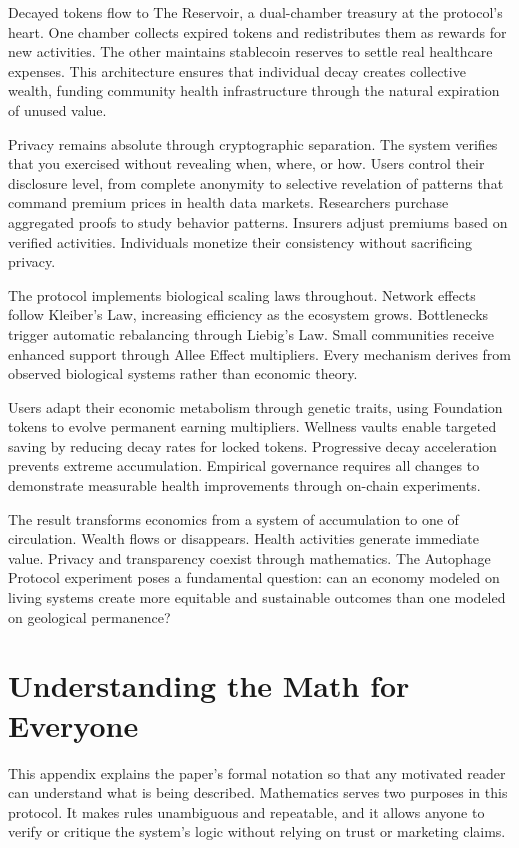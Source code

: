 \documentclass[11pt,letterpaper]{article}
\begin{document}
Decayed tokens flow to The Reservoir, a dual-chamber treasury at the protocol's heart. One chamber collects expired tokens and redistributes them as rewards for new activities. The other maintains stablecoin reserves to settle real healthcare expenses. This architecture ensures that individual decay creates collective wealth, funding community health infrastructure through the natural expiration of unused value.

Privacy remains absolute through cryptographic separation. The system verifies that you exercised without revealing when, where, or how. Users control their disclosure level, from complete anonymity to selective revelation of patterns that command premium prices in health data markets. Researchers purchase aggregated proofs to study behavior patterns. Insurers adjust premiums based on verified activities. Individuals monetize their consistency without sacrificing privacy.

\clearpage

The protocol implements biological scaling laws throughout. Network effects follow Kleiber's Law, increasing efficiency as the ecosystem grows. Bottlenecks trigger automatic rebalancing through Liebig's Law. Small communities receive enhanced support through Allee Effect multipliers. Every mechanism derives from observed biological systems rather than economic theory.

Users adapt their economic metabolism through genetic traits, using Foundation tokens to evolve permanent earning multipliers. Wellness vaults enable targeted saving by reducing decay rates for locked tokens. Progressive decay acceleration prevents extreme accumulation. Empirical governance requires all changes to demonstrate measurable health improvements through on-chain experiments.

The result transforms economics from a system of accumulation to one of circulation. Wealth flows or disappears. Health activities generate immediate value. Privacy and transparency coexist through mathematics. The Autophage Protocol experiment poses a fundamental question: can an economy modeled on living systems create more equitable and sustainable outcomes than one modeled on geological permanence?

\section{Understanding the Math for Everyone}

This appendix explains the paper's formal notation so that any motivated reader can understand what is being described. Mathematics serves two purposes in this protocol. It makes rules unambiguous and repeatable, and it allows anyone to verify or critique the system’s logic without relying on trust or marketing claims.
\end{document}
